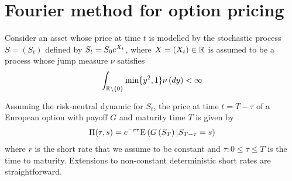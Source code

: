 \documentclass[11pt]{amsart}
\begin{document}
\section{Fourier method for option pricing}

\label{section:Method}
Consider an asset whose price at time $t$ is modelled 
by the stochastic process $S=(S_t)$ defined by $S_t=S_0 e^{X_t}$,
where $X=(X_t) \in \mathbb{R}$ is assumed to be
a \levy process whose jump measure $\nu$ satisfies
\begin{align} \label{eq:nuhyp}
\int_{\mathbb{R} \setminus \left\lbrace {0} \right\rbrace} \min\{y^2,1\} \nu \left( {dy} \right) < \infty
\end{align}

Assuming the risk-neutral dynamic for $S_t$, the price at time $t=T-\tau$ of a European option
with payoff $G$ and maturity time $T$ is given by
\begin{align*}
\Pi(\tau,s)=e^{-r\tau} \mathrm{E} \left( {{G\left( {S_T} \right)|S_{T-\tau}=s}} \right)
\end{align*}
where $r$ is the short rate that we assume to be constant and $\tau\colon 0\leq\tau\leq T$ is the time to maturity. 
Extensions to non-constant deterministic short rates are straightforward.
\end{document}
